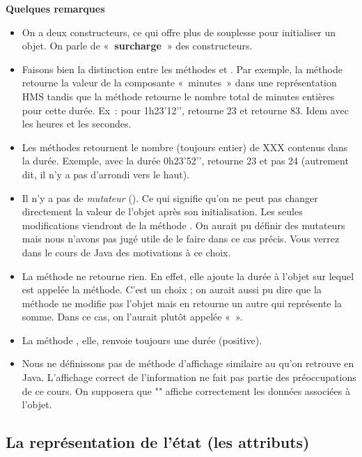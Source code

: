 		\textbf{Quelques remarques}
		\begin{itemize}
			\item
				On a deux constructeurs, ce qui offre plus de souplesse pour initialiser un objet. 
				On parle de «\textbf{~surcharge~}» des constructeurs.
			\item
				Faisons bien la distinction entre les méthodes
				 et . Par
				exemple, la méthode  retourne la valeur
				de la composante «~minutes~» dans une représentation HMS tandis que la
				méthode  retourne le nombre total
				de minutes entières pour cette durée. Ex~: pour 1h23’12’’,
				 retourne 23 et
				 retourne 83. 
				Idem avec les heures et les secondes.
			\item 
				Les méthodes  retournent le nombre
				(toujours entier) de XXX contenus dans la durée. Exemple, avec la durée
				0h23’52'’, 
				retourne 23 et pas 24 (autrement dit, il n’y a pas d’arrondi vers le
				haut).
			\item 
				Il n’y a pas de \textit{mutateur} (). 
				Ce qui signifie qu’on ne peut pas changer directement la valeur de l’objet
				après son initialisation. 
				Les seules modifications viendront de la méthode .
				On aurait pu définir des mutateurs mais nous
				n'avons pas jugé utile de le faire dans ce cas précis.
				Vous verrez dans le cours de Java des motivations à ce choix.
			\item 
				La méthode  ne retourne rien. En effet,
				elle ajoute la durée à l’objet sur lequel est appelée la méthode. C’est
				un choix ; on aurait aussi pu dire que la méthode ne modifie pas
				l’objet mais en retourne un autre qui représente la somme. Dans ce cas,
				on l’aurait plutôt appelée «~».
			\item 
				La méthode , elle, renvoie toujours une
				durée (positive).
			\item 
				Nous ne définissons pas de méthode d'affichage
				similaire au  qu'on retrouve en Java.
				L'affichage correct de l'information ne fait pas partie
				des préoccupations de ce cours.
				On supposera que ""
				affiche correctement les données associées à l'objet.
		\end{itemize}
	
	\subsection{La représentation de l'état (les attributs)}
	
